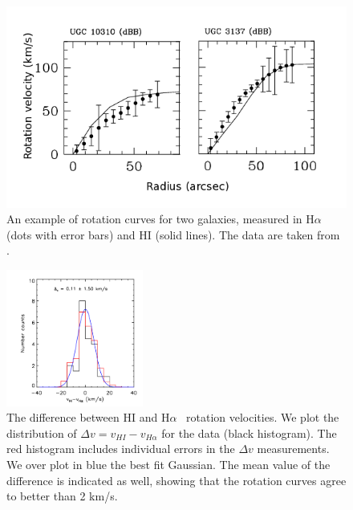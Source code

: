 \documentclass[useAMS,usenatbib,twocolumn]{mn2e}
\newcommand{\ha}{H$\alpha$}
\begin{document}
\begin{figure}
\begin{center}
  \includegraphics[scale=0.4]{figures/H1-HA-rot-eg.png}
\caption{An example of rotation curves for two galaxies, measured in \ha{}
(dots with error bars) and HI (solid lines).
The data are taken from \citet{Swaters2009}.}
\label{h1-ha-rot-eg}
\end{center}
\end{figure}

\begin{figure}
\begin{center}
\includegraphics[trim= 0cm 0cm 0cm 0cm, clip = true,
width=0.4\textwidth]{figures/vivalpha.png}
\caption{The difference between HI and \ha~ rotation velocities.
We plot the distribution of $\Delta {v}=v_{HI}-v_{H\alpha}$ for the 
\citet{Swaters2009} data (black histogram). The red histogram includes 
individual errors in the $\Delta v$ measurements. We over plot in
blue the best fit Gaussian. The mean value of the difference is indicated as well, showing that the 
rotation curves agree
to better than 2 km/s.}
\label{h1-ha-rot}
\end{center}
\end{figure}
\end{document}
